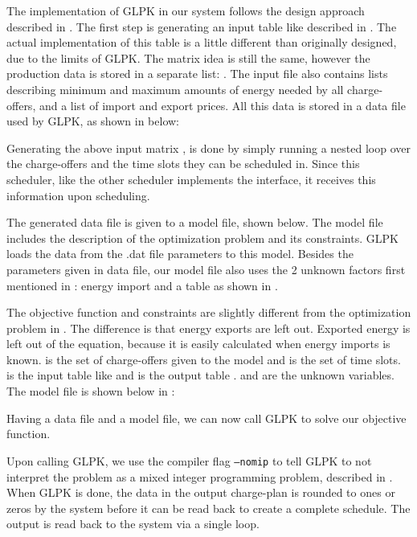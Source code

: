 The implementation of GLPK in our system follows the design approach described in . The first step is generating an input table like described in . The actual implementation of this table is a little different than originally designed, due to the limits of GLPK. The matrix idea is still the same, however the production data is stored in a separate list: . The input file also contains lists describing minimum and maximum amounts of energy needed by all charge-offers, and a list of import and export prices. All this data is stored in a data file used by GLPK, as shown in  below:  



Generating the above input matrix , is done by simply running a nested loop over the charge-offers and the time slots they can be scheduled in. Since this scheduler, like the other scheduler implements the  interface, it receives this information upon scheduling.

The generated data file is given to a model file, shown below. The model file includes the description of the optimization problem and its constraints. GLPK loads the data from the .dat file parameters to this model. Besides the parameters given in data file, our model file also uses the 2 unknown factors first mentioned in : energy import and a table as shown in .

The objective function and constraints are slightly different from the optimization problem in . The difference is that energy exports are left out. Exported energy is left out of the equation, because it is easily calculated when energy imports is known.  is the set of charge-offers given to the model and  is the set of time slots.  is the input table like  and  is the output table .  and  are the unknown variables. The model file is shown below in :


Having a data file and a model file, we can now call GLPK to solve our objective function. 

Upon calling GLPK, we use the compiler flag \texttt{--nomip} to tell GLPK to not interpret the problem as a mixed integer programming problem, described in . When GLPK is done, the data in the output charge-plan is rounded to ones or zeros by the system before it can be read back to create a complete schedule. The output is read back to the system via a single loop.

